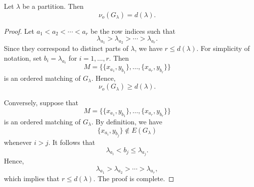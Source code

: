 \documentclass[10pt,a4paper]{amsart}
\begin{document}
\begin{lem}\label{lem_ordered_Ferrers}
Let $\lambda$ be a partition. Then
\[
\nu_o(G_\lambda) = d(\lambda).
\]
\end{lem}

\begin{proof}
Let
\( a_1 < a_2 < \cdots < a_r
\) be the row indices such that
\[
\lambda_{a_1} > \lambda_{a_2} > \cdots > \lambda_{a_r}.
\]
Since they correspond to distinct parts of $\lambda$, we have $r \le d(\lambda)$. For simplicity of notation, set \(b_i = \lambda_{a_i}
\) for $i = 1, \ldots, r$. Then
\[
M = \{\{x_{a_1}, y_{b_1}\}, \ldots, \{x_{a_r}, y_{b_r}\}\}
\]
is an ordered matching of $G_\lambda$. Hence,
\[
\nu_o(G_\lambda) \ge d(\lambda).
\]

Conversely, suppose that
\[
M = \{\{x_{a_1}, y_{b_1}\}, \ldots, \{x_{a_r}, y_{b_r}\}\}
\]
is an ordered matching of $G_\lambda$. By definition, we have
\[
\{x_{a_i}, y_{b_j}\} \notin E(G_\lambda)
\]
whenever $i > j$. It follows that
\[
\lambda_{a_i} < b_j \le \lambda_{a_j}.
\]
Hence,
\[
\lambda_{a_1} > \lambda_{a_2} > \cdots > \lambda_{a_r},
\]
which implies that $r \le d(\lambda)$. The proof is complete.
\end{proof}
\end{document}
